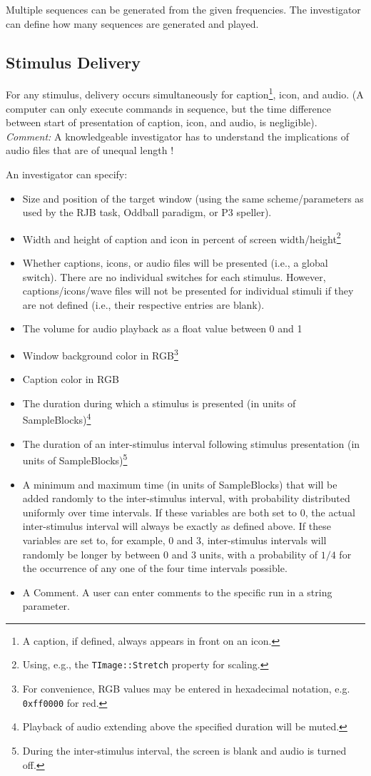\documentclass[letterpaper,oneside,12pt]{article}
\begin{document}
Multiple sequences can be generated from the given frequencies.
The investigator can define how many sequences are generated and played.

\subsection{Stimulus Delivery}

For any stimulus, delivery occurs simultaneously for caption\footnote{A caption, 
if defined, always appears in front on an icon.}, icon, and audio. (A computer 
can only execute commands in sequence, but the time difference between start of 
presentation of caption, icon, and audio, is negligible). \emph{Comment:} A 
knowledgeable investigator has to understand the implications of audio files 
that are of unequal length !

An investigator can specify:
\begin{itemize}
 \item Size and position of the target window (using the same scheme/parameters 
       as used by the RJB task, Oddball paradigm, or P3 speller).
 \item Width and height of caption and icon in percent of screen
       width/height\footnote{Using, e.g., the \texttt{TImage::Stretch} property for scaling.}
 \item Whether captions, icons, or audio files will be presented
       (i.e., a global switch). There are no individual switches for each stimulus. However,
       captions/icons/wave files will not be presented for individual stimuli if they are not defined (i.e., their respective entries are blank).
 \item The volume for audio playback as a float value between 0 and 1
 \item Window background color in RGB\footnote{For convenience, RGB values
       may be entered in hexadecimal notation, e.g. \texttt{0xff0000} for red.}
 \item Caption color in RGB
 \item The duration during which a stimulus is presented (in units of
       SampleBlocks)\footnote{Playback of audio extending above the specified duration 
       will be muted.}
 \item The duration of an inter-stimulus interval following stimulus presentation
       (in units of SampleBlocks)\footnote{During the inter-stimulus interval, the
       screen is blank and audio is turned off.}
 \item A minimum and maximum time (in units of SampleBlocks) that will be added randomly
       to the inter-stimulus interval, with probability distributed uniformly over time
       intervals.
       If these variables are both set to 0, the actual inter-stimulus interval will
       always be exactly as defined above.
       If these variables are set to, for example, 0 and 3, inter-stimulus intervals
       will randomly be longer by between 0 and 3 units, with a probability of $1/4$
       for the occurrence of any one of the four time intervals possible.
 \item A Comment. A user can enter comments to the specific run in a string parameter.
\end{itemize}
\end{document}
